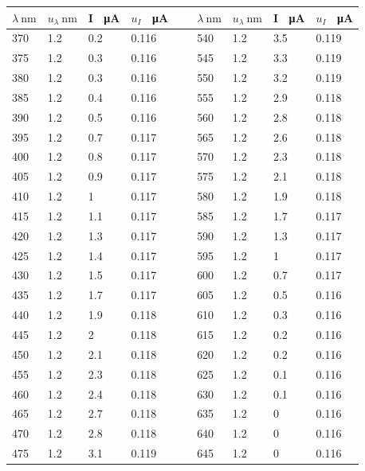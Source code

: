 \begin{table}[H]
\begin{tabular}{l|l|l|l|l|l|l|l|l}
        $\lambda \SI{}{\nano\meter}$ & $u_{\lambda} \SI{}{\nano\meter}$ & I \SI{}{\micro\ampere} & $u_I$ \SI{}{\micro\ampere}& ~ & $\lambda \SI{}{\nano\meter}$ & $u_{\lambda} \SI{}{\nano\meter}$ & I \SI{}{\micro\ampere} & $u_I$ \SI{}{\micro\ampere} \\ \hline
        370 & 1.2 & 0.2 & 0.116 && 540 & 1.2 & 3.5 & 0.119 \\ \hline
        375 & 1.2 & 0.3 & 0.116 && 545 & 1.2 & 3.3 & 0.119 \\ \hline
        380 & 1.2 & 0.3 & 0.116 && 550 & 1.2 & 3.2 & 0.119 \\ \hline
        385 & 1.2 & 0.4 & 0.116 && 555 & 1.2 & 2.9 & 0.118 \\ \hline
        390 & 1.2 & 0.5 & 0.116 && 560 & 1.2 & 2.8 & 0.118 \\ \hline
        395 & 1.2 & 0.7 & 0.117 && 565 & 1.2 & 2.6 & 0.118 \\ \hline
        400 & 1.2 & 0.8 & 0.117 && 570 & 1.2 & 2.3 & 0.118 \\ \hline
        405 & 1.2 & 0.9 & 0.117 && 575 & 1.2 & 2.1 & 0.118 \\ \hline
        410 & 1.2 & 1 & 0.117 && 580 & 1.2 & 1.9 & 0.118 \\ \hline
        415 & 1.2 & 1.1 & 0.117 && 585 & 1.2 & 1.7 & 0.117 \\ \hline
        420 & 1.2 & 1.3 & 0.117 && 590 & 1.2 & 1.3 & 0.117 \\ \hline
        425 & 1.2 & 1.4 & 0.117 && 595 & 1.2 & 1 & 0.117 \\ \hline
        430 & 1.2 & 1.5 & 0.117 && 600 & 1.2 & 0.7 & 0.117 \\ \hline
        435 & 1.2 & 1.7 & 0.117 && 605 & 1.2 & 0.5 & 0.116 \\ \hline
        440 & 1.2 & 1.9 & 0.118 && 610 & 1.2 & 0.3 & 0.116 \\ \hline
        445 & 1.2 & 2 & 0.118 && 615 & 1.2 & 0.2 & 0.116 \\ \hline
        450 & 1.2 & 2.1 & 0.118 && 620 & 1.2 & 0.2 & 0.116 \\ \hline
        455 & 1.2 & 2.3 & 0.118 && 625 & 1.2 & 0.1 & 0.116 \\ \hline
        460 & 1.2 & 2.4 & 0.118 && 630 & 1.2 & 0.1 & 0.116 \\ \hline
        465 & 1.2 & 2.7 & 0.118 && 635 & 1.2 & 0 & 0.116 \\ \hline
        470 & 1.2 & 2.8 & 0.118 && 640 & 1.2 & 0 & 0.116 \\ \hline
        475 & 1.2 & 3.1 & 0.119 && 645 & 1.2 & 0 & 0.116 \\ \hline

\end{tabular}
\end{table}
